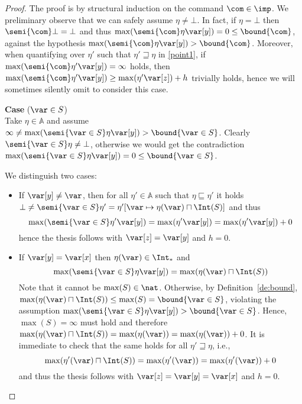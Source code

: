 \begin{proof}
  The proof is by structural induction on the command \(\com\in \imp\).
  We preliminary observe that we can safely assume
  \(\eta \neq \bot\).
  In fact, if \(\eta = \bot\) then \(\semi{\com} \bot = \bot\) and
  thus \(\max(\semi{\com} \eta \var[y]) = 0 \leq \bound{\com}\),
  against the hypothesis
  \(\max(\semi{\com}\eta \var[y]) > \bound{\com}\). Moreover, when
  quantifying over \(\eta'\) such that \(\eta' \sqsupseteq \eta\) in
  \ref{point1}, if \(\max(\semi{\com}\eta' \var[y]) = \infty\)
  holds, then
  \(\max(\semi{\com}\eta' \var[y]) \geq \max(\eta' \var[z]) + h\)
  trivially holds, hence we will sometimes silently omit to consider
  this case.
  
  \medskip
  
  \noindent
  \textbf{Case} (\(\var \in S\))\\
  Take \(\eta \in \mathbb{A}\) and assume
  \(\infty\neq\max(\semi{\var \in S}\eta \var[y]) > \bound{\var \in S}\).
  Clearly \(\semi{\var \in S}\eta \neq \bot\), otherwise we would get the contradiction
  \(\max(\semi{\var \in S}\eta \var[y]) =0 \leq \bound{\var \in S}\).
  
  We distinguish two cases:
  \begin{itemize}
    
  \item If \(\var[y] \neq \var\), then for all \(\eta' \in \mathbb{A}\)
    such that \(\eta \sqsubseteq \eta'\) it holds
    \(\bot \neq \semi{\var \in S}\eta' = \eta'[\var \mapsto \eta(\var)
      \sqcap \Int(S)]\) and thus
    \[
    \max(\semi{\var \in S}\eta' \var[y]) = \max(\eta' \var[y]) = \max(\eta' \var[y]) + 0
    \]
    hence the thesis follows with \(\var[z]=\var[y]\) and \(h = 0\).

  \item If \(\var[y] = \var[x]\) then  \(\eta(\var) \in \Int_*\) and
    \[ 
    \max(\semi{\var \in S}\eta \var[y]) = \max (\eta(\var) \sqcap
    \Int(S))
    \]
    Note that it cannot be \(\max(S)\in \nat\). Otherwise, by
    Definition~\ref{de:bound},
    \(\max (\eta(\var) \sqcap \Int(S)) \leq \max(S)= \bound{\var \in
      S}\), violating the assumption \(\max(\semi{\var \in S}\eta \var[y]) > \bound{\var \in S}\).
    Hence, \(\max(S) = \infty\) must hold and therefore
    \(\max (\eta(\var) \sqcap \Int(S)) = \max(\eta(\var))=
    \max(\eta(\var))+0\). It is immediate to check that the same holds
    for all
    \(\eta' \sqsupseteq \eta\), i.e.,
    \[
    \max (\eta'(\var) \sqcap \Int(S)) = \max(\eta'(\var))=
    \max(\eta'(\var))+0
    \]
    and thus the thesis follows with  \(\var[z]=\var[y]=\var[x]\) and \(h=0\).
  \end{itemize}  
  

\end{proof}
